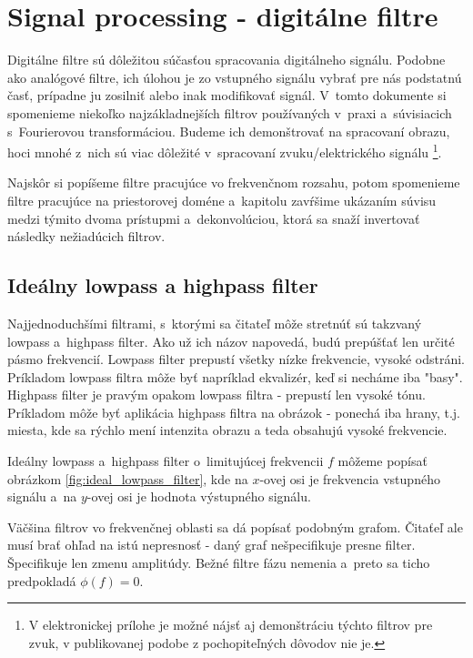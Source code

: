 \section{Signal processing - digitálne filtre}
Digitálne filtre sú dôležitou súčasťou spracovania digitálneho
signálu. Podobne ako analógové filtre, ich úlohou je zo vstupného
signálu vybrať pre nás podstatnú časť, prípadne ju zosilniť alebo inak
modifikovať signál. V~tomto dokumente si spomenieme niekoľko 
najzákladnejších filtrov používaných v~praxi a~súvisiacich s~Fourierovou
transformáciou. Budeme ich demonštrovať na spracovaní obrazu, hoci
mnohé z~nich sú viac dôležité v~spracovaní zvuku/elektrického signálu 
\footnote{V elektronickej prílohe je možné nájsť aj demonštráciu 
týchto filtrov pre zvuk, v publikovanej podobe z pochopiteľných
dôvodov nie je.}.

Najskôr si popíšeme filtre pracujúce vo frekvenčnom rozsahu, potom
spomenieme filtre pracujúce na priestorovej doméne a~kapitolu
zavŕšime ukázaním súvisu medzi týmito dvoma prístupmi 
a~dekonvolúciou, ktorá sa snaží invertovať následky nežiadúcich filtrov.

\subsection{Ideálny lowpass a highpass filter}

Najjednoduchšími filtrami, s~ktorými sa čitateľ môže stretnúť sú
takzvaný lowpass a~highpass filter. Ako už ich názov napovedá, budú
prepúšťať len určité pásmo frekvencií. Lowpass filter prepustí všetky
nízke frekvencie, vysoké odstráni. Príkladom lowpass filtra môže byť
napríklad ekvalizér, keď si necháme iba "basy". Highpass filter je
pravým opakom lowpass filtra - prepustí len vysoké tónu. Príkladom
môže byť aplikácia highpass filtra na obrázok - ponechá iba hrany,
t.j. miesta, kde sa rýchlo mení intenzita obrazu a teda obsahujú
vysoké frekvencie.

Ideálny lowpass a~highpass filter o~limitujúcej frekvencii $f$ môžeme
popísať obrázkom \ref{fig:ideal_lowpass_filter}, 
kde na $x$-ovej osi je frekvencia
vstupného signálu a~na $y$-ovej osi je hodnota výstupného signálu.
\begin{poznamka}
    Väčšina filtrov vo frekvenčnej oblasti sa dá popísať podobným grafom.
    Čitaťeľ ale musí brať ohľad na istú nepresnosť - daný graf
    nešpecifikuje presne filter. Špecifikuje len zmenu amplitúdy.
    Bežné filtre fázu nemenia a~preto sa ticho predpokladá $\phi(f)=0$.
\end{poznamka}

